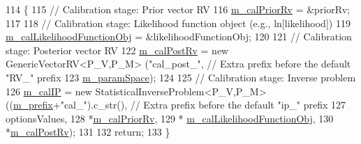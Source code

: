 \begin{DoxyCode}
114 \{
115   \textcolor{comment}{// Calibration stage: Prior vector RV}
116   \hyperlink{class_q_u_e_s_o_1_1_validation_cycle_a9f8c93eb68908f51b728af2fffbfb4a8}{m\_calPriorRv} = &priorRv;
117 
118   \textcolor{comment}{// Calibration stage: Likelihood function object (e.g., ln[likelihood])}
119   \hyperlink{class_q_u_e_s_o_1_1_validation_cycle_a764d9a79a615317b0749ee69c2234d40}{m\_calLikelihoodFunctionObj} = &likelihoodFunctionObj;
120 
121   \textcolor{comment}{// Calibration stage: Posterior vector RV}
122   \hyperlink{class_q_u_e_s_o_1_1_validation_cycle_a535b6447a44ac7191e12e887d1710ef0}{m\_calPostRv} = \textcolor{keyword}{new} GenericVectorRV<P\_V,P\_M> (\textcolor{stringliteral}{"cal\_post\_"}, \textcolor{comment}{// Extra prefix before the default
       "RV\_" prefix}
123                                                      \hyperlink{class_q_u_e_s_o_1_1_validation_cycle_a641d2e59aed41a93a787c71ec30b6e07}{m\_paramSpace});
124 
125   \textcolor{comment}{// Calibration stage: Inverse problem}
126   \hyperlink{class_q_u_e_s_o_1_1_validation_cycle_afa19cacc32a262840f2108ed405f0521}{m\_calIP} = \textcolor{keyword}{new} StatisticalInverseProblem<P\_V,P\_M> ((\hyperlink{class_q_u_e_s_o_1_1_validation_cycle_adcc61017a11c99f3a6189ddbf7bc76fc}{m\_prefix}+\textcolor{stringliteral}{"cal\_"}).c\_str(), \textcolor{comment}{// Extra
       prefix before the default "ip\_" prefix}
127                                                            optionsValues,
128                                                            *\hyperlink{class_q_u_e_s_o_1_1_validation_cycle_a9f8c93eb68908f51b728af2fffbfb4a8}{m\_calPriorRv},
129                                                            *
      \hyperlink{class_q_u_e_s_o_1_1_validation_cycle_a764d9a79a615317b0749ee69c2234d40}{m\_calLikelihoodFunctionObj},
130                                                            *\hyperlink{class_q_u_e_s_o_1_1_validation_cycle_a535b6447a44ac7191e12e887d1710ef0}{m\_calPostRv});
131 
132   \textcolor{keywordflow}{return};
133 \}
\end{DoxyCode}
